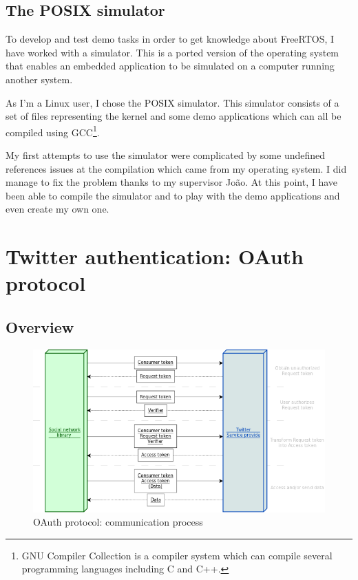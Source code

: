 \subsection{The POSIX simulator}

\hspace{15mm}To develop and test demo tasks in order to get knowledge about FreeRTOS, I have worked with a simulator. This is a ported version of the operating system that enables an embedded application to be simulated on a computer running another system.

As I'm a Linux user, I chose the POSIX simulator. This simulator consists of a set of files representing the kernel and some demo applications which can all be compiled using GCC\footnote{GNU Compiler Collection is a compiler system which can compile several programming languages including C and C++.}.

My first attempts to use the simulator were complicated by some undefined references issues at the compilation which came from my operating system. I did manage to fix the problem thanks to my supervisor Jo\~{a}o. At this point, I have been able to compile the simulator and to play with the demo applications and even create my own one.



\section{Twitter authentication: OAuth protocol}

\subsection{Overview}

\begin{figure}[h]
  \centering
  \includegraphics[scale=0.75]{images/oauth.png}
  \caption{OAuth protocol: communication process}
\end{figure}

